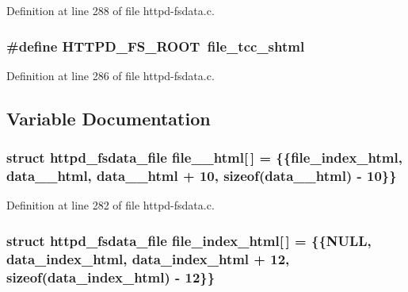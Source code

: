 Definition at line 288 of file httpd-\/fsdata.c.

\hypertarget{httpd-fsdata_8c_ad3cba2495e43b8b94875657c9e32c5ec}{
\subsubsection[{HTTPD\_\-FS\_\-ROOT}]{\setlength{\rightskip}{0pt plus 5cm}\#define HTTPD\_\-FS\_\-ROOT~{\bf file\_\-tcc\_\-shtml}}}
\label{httpd-fsdata_8c_ad3cba2495e43b8b94875657c9e32c5ec}


Definition at line 286 of file httpd-\/fsdata.c.



\subsection{Variable Documentation}
\hypertarget{httpd-fsdata_8c_a90d9c213dbaa0c0e2ed4a1c4d3d28c54}{
\subsubsection[{file\_\-404\_\-html}]{\setlength{\rightskip}{0pt plus 5cm}struct {\bf httpd\_\-fsdata\_\-file} {\bf file\_\_\-html}\mbox{[}$\,$\mbox{]} = \{\{{\bf file\_\-index\_\-html}, data\_\_\-html, data\_\_\-html + 10, sizeof(data\_\_\-html) -\/ 10\}\}}}
\label{httpd-fsdata_8c_a90d9c213dbaa0c0e2ed4a1c4d3d28c54}


Definition at line 282 of file httpd-\/fsdata.c.

\hypertarget{httpd-fsdata_8c_afaff04f8c298dff87119cd02af091093}{
\subsubsection[{file\_\-index\_\-html}]{\setlength{\rightskip}{0pt plus 5cm}struct {\bf httpd\_\-fsdata\_\-file} {\bf file\_\-index\_\-html}\mbox{[}$\,$\mbox{]} = \{\{NULL, data\_\-index\_\-html, data\_\-index\_\-html + 12, sizeof(data\_\-index\_\-html) -\/ 12\}\}}}
\label{httpd-fsdata_8c_afaff04f8c298dff87119cd02af091093}


